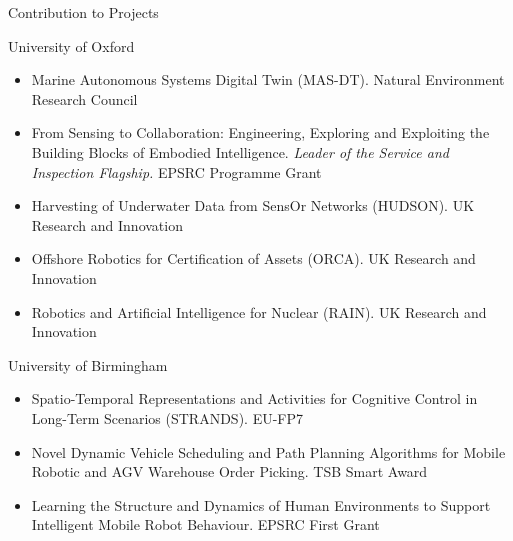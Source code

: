 
\begin{rSection}{Contribution to Projects}

\item University of Oxford
\begin{itemize}
\item Marine Autonomous Systems Digital Twin (MAS-DT). Natural Environment Research Council
\item From Sensing to Collaboration: Engineering, Exploring and Exploiting the Building Blocks of Embodied Intelligence. \emph{Leader of the Service and Inspection Flagship.} EPSRC Programme Grant
\item Harvesting of Underwater Data from SensOr Networks (HUDSON). UK Research and Innovation
\item Offshore Robotics for Certification of Assets (ORCA). UK Research and Innovation
\item Robotics and Artificial Intelligence for Nuclear (RAIN). UK Research and Innovation
\end{itemize}

\item University of Birmingham
\begin{itemize}
\item Spatio-Temporal Representations and Activities for Cognitive Control in Long-Term
Scenarios (STRANDS). EU-FP7
\item Novel Dynamic Vehicle Scheduling and Path Planning Algorithms for Mobile Robotic
and AGV Warehouse Order Picking. TSB Smart Award
\item Learning the Structure and Dynamics of Human Environments to Support Intelligent
Mobile Robot Behaviour. EPSRC First Grant
\end{itemize}


\end{rSection}
